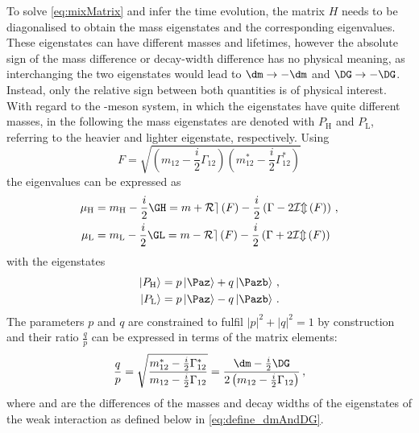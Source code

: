 To solve \cref{eq:mixMatrix} and infer the time evolution, the matrix $H$ needs to be diagonalised to obtain the mass eigenstates and the corresponding eigenvalues.
These eigenstates can have different masses and lifetimes, however the absolute sign of the mass difference \dm or decay-width difference \DG has no physical meaning, as interchanging the two eigenstates would lead to $\dm\to-\dm$ and $\DG\to-\DG$.
Instead, only the relative sign between both quantities is of physical interest.
With regard to the \Bz-meson system, in which the eigenstates have quite different masses, in the following the mass eigenstates are denoted with $P_\text{H}$ and $P_\text{L}$, referring to the heavier and lighter eigenstate, respectively.
Using
\begin{equation}
F=\sqrt{\left(m_{12}-\frac{i}{2}\Gamma_{12}\right)\left(m_{12}^\ast-\frac{i}{2}\Gamma_{12}^\ast\right)}
\end{equation}
the eigenvalues can be expressed as
\begin{equation}
\begin{split}
\mu_\text{H} &= m_\text{H}-\frac{i}{2}\GH = m + \mathcal{Re}\left(F\right)-\frac{i}{2}\left(\Gamma-2\mathcal{Im}\left(F\right)\right)\,,\\
\mu_\text{L} &= m_\text{L}-\frac{i}{2}\GL = m - \mathcal{Re}\left(F\right)-\frac{i}{2}\left(\Gamma+2\mathcal{Im}\left(F\right)\right)\label{eq:Mass_eigenvalues}
\end{split}
\end{equation}
with the eigenstates
\begin{equation}
\begin{split}
\left|P_\text{H}\right>&= p\left|\Paz\right>+q\left|\Pazb\right>\,,\\
\left|P_\text{L}\right>&= p\left|\Paz\right>-q\left|\Pazb\right>\,.\label{eq:Mass_eigenstates}
\end{split}
\end{equation}
The parameters $p$ and $q$ are constrained to fulfil $\left|p\right|^2\!+\left|q\right|^2=1$ by construction and their ratio $\frac{q}{p}$ can be expressed in terms of the matrix elements:
\begin{equation}
\frac{q}{p}=\sqrt{ \frac{ m_{12}^\ast-\frac{i}{2}\Gamma_{12}^\ast }{ m_{12}-\frac{i}{2}\Gamma_{12} }}
=\frac{\dm-\frac{i}{2}\DG}{2\left(m_{12}-\frac{i}{2}\Gamma_{12}\right)}\,,\label{eq:qoverp}
\end{equation}
where \dm and \DG are the differences of the masses and decay widths of the eigenstates of the weak interaction as defined below in \cref{eq:define_dmAndDG}.
